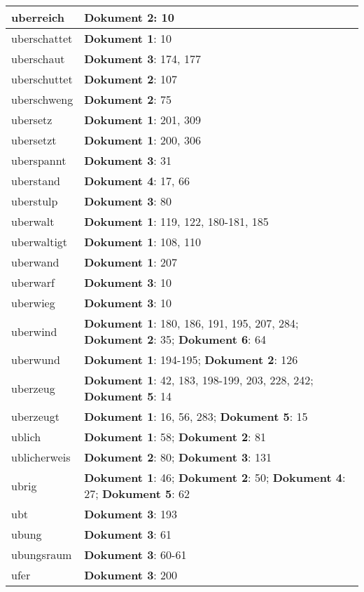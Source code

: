 \documentclass[a5paper]{article}
\begin{document}
\begin{longtable}[l]{|l|p{3in}|}
\hline
uberreich & \textbf{Dokument 2}: 10 \\
\hline
uberschattet & \textbf{Dokument 1}: 10 \\
\hline
uberschaut & \textbf{Dokument 3}: 174, 177 \\
\hline
uberschuttet & \textbf{Dokument 2}: 107 \\
\hline
uberschweng & \textbf{Dokument 2}: 75 \\
\hline
ubersetz & \textbf{Dokument 1}: 201, 309 \\
\hline
ubersetzt & \textbf{Dokument 1}: 200, 306 \\
\hline
uberspannt & \textbf{Dokument 3}: 31 \\
\hline
uberstand & \textbf{Dokument 4}: 17, 66 \\
\hline
uberstulp & \textbf{Dokument 3}: 80 \\
\hline
uberwalt & \textbf{Dokument 1}: 119, 122, 180-181, 185 \\
\hline
uberwaltigt & \textbf{Dokument 1}: 108, 110 \\
\hline
uberwand & \textbf{Dokument 1}: 207 \\
\hline
uberwarf & \textbf{Dokument 3}: 10 \\
\hline
uberwieg & \textbf{Dokument 3}: 10 \\
\hline
uberwind & \textbf{Dokument 1}: 180, 186, 191, 195, 207, 284; \textbf{Dokument 2}: 35; \textbf{Dokument 6}: 64 \\
\hline
uberwund & \textbf{Dokument 1}: 194-195; \textbf{Dokument 2}: 126 \\
\hline
uberzeug & \textbf{Dokument 1}: 42, 183, 198-199, 203, 228, 242; \textbf{Dokument 5}: 14 \\
\hline
uberzeugt & \textbf{Dokument 1}: 16, 56, 283; \textbf{Dokument 5}: 15 \\
\hline
ublich & \textbf{Dokument 1}: 58; \textbf{Dokument 2}: 81 \\
\hline
ublicherweis & \textbf{Dokument 2}: 80; \textbf{Dokument 3}: 131 \\
\hline
ubrig & \textbf{Dokument 1}: 46; \textbf{Dokument 2}: 50; \textbf{Dokument 4}: 27; \textbf{Dokument 5}: 62 \\
\hline
ubt & \textbf{Dokument 3}: 193 \\
\hline
ubung & \textbf{Dokument 3}: 61 \\
\hline
ubungsraum & \textbf{Dokument 3}: 60-61 \\
\hline
ufer & \textbf{Dokument 3}: 200 \\
\hline

\end{longtable}
\end{document}
